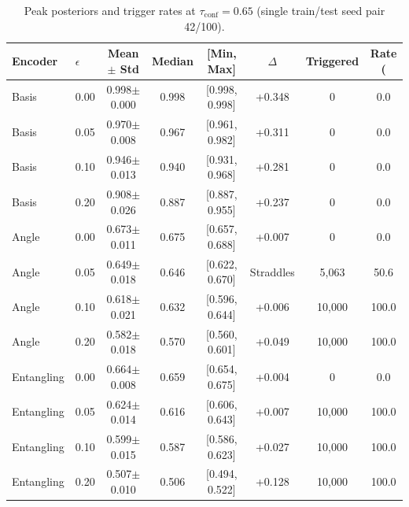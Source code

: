 \begin{table}[htbp]
\centering
\small
\caption{Peak posteriors and trigger rates at $\tau_{\mathrm{conf}}=0.65$ (single train/test seed pair 42/100).}
\label{tab:lime_trigger_distribution}
\begin{tabular}{llcccccc}
\toprule
Encoder & $\epsilon$ & Mean $\pm$ Std & Median & [Min, Max] & $\Delta$ & Triggered & Rate (\\%
\midrule
Basis & 0.00 & 0.998$\pm$0.000 & 0.998 & [0.998, 0.998] & +0.348 & 0 & 0.0 \\
Basis & 0.05 & 0.970$\pm$0.008 & 0.967 & [0.961, 0.982] & +0.311 & 0 & 0.0 \\
Basis & 0.10 & 0.946$\pm$0.013 & 0.940 & [0.931, 0.968] & +0.281 & 0 & 0.0 \\
Basis & 0.20 & 0.908$\pm$0.026 & 0.887 & [0.887, 0.955] & +0.237 & 0 & 0.0 \\
\midrule
Angle & 0.00 & 0.673$\pm$0.011 & 0.675 & [0.657, 0.688] & +0.007 & 0 & 0.0 \\
Angle & 0.05 & 0.649$\pm$0.018 & 0.646 & [0.622, 0.670] & Straddles & 5{,}063 & 50.6 \\
Angle & 0.10 & 0.618$\pm$0.021 & 0.632 & [0.596, 0.644] & +0.006 & 10{,}000 & 100.0 \\
Angle & 0.20 & 0.582$\pm$0.018 & 0.570 & [0.560, 0.601] & +0.049 & 10{,}000 & 100.0 \\
\midrule
Entangling & 0.00 & 0.664$\pm$0.008 & 0.659 & [0.654, 0.675] & +0.004 & 0 & 0.0 \\
Entangling & 0.05 & 0.624$\pm$0.014 & 0.616 & [0.606, 0.643] & +0.007 & 10{,}000 & 100.0 \\
Entangling & 0.10 & 0.599$\pm$0.015 & 0.587 & [0.586, 0.623] & +0.027 & 10{,}000 & 100.0 \\
Entangling & 0.20 & 0.507$\pm$0.010 & 0.506 & [0.494, 0.522] & +0.128 & 10{,}000 & 100.0 \\
\bottomrule
\end{tabular}
\end{table}
